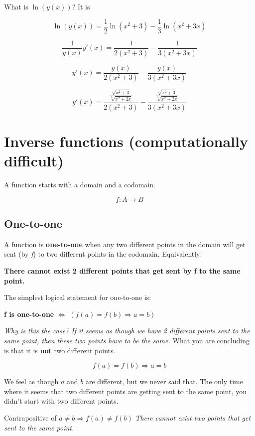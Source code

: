\documentclass[
]{article}
\begin{document}
What is $\ln\left( y(x) \right)$? It is

$$\ln\left( y(x) \right) = \frac{1}{2}\ln\left( x^{2} + 3 \right) - \frac{1}{3}\ln\left( x^{2} + 3x \right)$$

$$\frac{1}{y(x)}y'(x) = \frac{1}{2\left( x^{2} + 3 \right)} - \frac{1}{3\left( x^{2} + 3x \right)}$$

$$y'(x) = \frac{y(x)}{2\left( x^{2} + 3 \right)} - \frac{y(x)}{3\left( x^{2} + 3x \right)}$$

$$y'(x) = \frac{\frac{\sqrt{x^{2} + 3}}{\sqrt[3]{x^{2} + 2x}}}{2\left( x^{2} + 3 \right)} - \frac{\frac{\sqrt{x^{2} + 3}}{\sqrt[3]{x^{2} + 2x}}}{3\left( x^{2} + 3x \right)}$$


\section{Inverse functions (computationally
difficult)}

A function starts with a domain and a codomain.

$$f:A \rightarrow B$$


\subsection{One-to-one}

A function is \textbf{one-to-one} when any two different points in the
domain will get sent (by \emph{f}) to two different points in the
codomain. Equivalently:

\textbf{There cannot exist 2 different points that get sent by f to the
same point.}

The simplest logical statement for one-to-one is:

\textbf{f is one-to-one} $\Leftrightarrow$
$\left( f(a) = f(b) \Rightarrow a = b \right)$

\emph{Why is this the case? If it seems as though we have 2 different
points sent to the same point, then these two points have to be the
same.} What you are concluding is that it is \textbf{not} two different
points.

$$f(a) = f(b) \Rightarrow a = b$$

We feel as though $a$ and $b$ are different, but we never said that.
The only time where it seems that two different points are getting sent
to the same point, you didn't start with two different points.

Contrapositive of $a \neq b \Rightarrow f(a) \neq f(b)$ \emph{There
cannot exist two points that get sent to the same point.}
\end{document}
